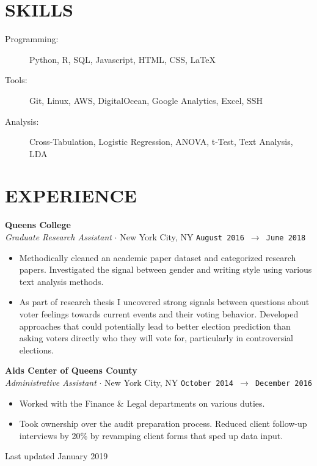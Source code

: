 \documentclass[margin, line, 11pt]{res}
\begin{document}
\begin{resume}
\section{SKILLS}

\begin{description}
\item[Programming:] Python, R, SQL, Javascript, HTML, CSS, \LaTeX
\item[Tools:] Git, Linux, AWS, DigitalOcean, Google Analytics, Excel, SSH
\item[Analysis:] Cross-Tabulation, Logistic Regression, ANOVA, t-Test, Text Analysis, LDA
\end{description}

\section{EXPERIENCE}

{\bf Queens College}\vspace{0.04in}
\\ {\it Graduate Research Assistant} $\cdot$ New York City, NY \hfill\texttt{August 2016 $\to$ June 2018}\vspace{0.04in}
\begin{itemize}
\item Methodically cleaned an academic paper dataset and categorized research papers. Investigated the signal between gender and writing style using various text analysis methods. 
\item As part of research thesis I uncovered strong signals between questions about voter feelings towards current events and their voting behavior. Developed approaches that could potentially lead to better election prediction than asking voters directly who they will vote for, particularly in controversial elections.
\end{itemize}

{\bf Aids Center of Queens County}\vspace{0.04in}
\\ {\it Administrative Assistant} $\cdot$ New York City, NY \hfill\texttt{October 2014 $\to$ December 2016}\vspace{0.04in}
\begin{itemize}
\item Worked with the Finance \& Legal departments on various duties.
\item Took ownership over the audit preparation process. Reduced client follow-up interviews by 20\% by revamping client forms that sped up data input.
\end{itemize}

\end{resume}

\hfill{Last updated January 2019}
\end{document}
